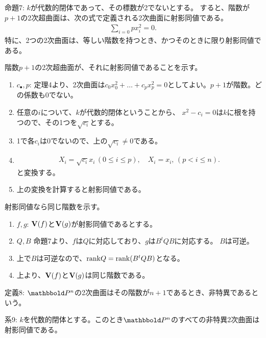 \begin{framed}
  命題7:
  $k$が代数的閉体であって、その標数が2でないとする。
  すると、階数が$p+1$の2次超曲面は、次の式で定義される2次曲面に射影同値である。
  \begin{align}
    \sum_{i=0}p x_i^2 = 0.
  \end{align}
  特に、2つの2次曲面は、等しい階数を持つとき、かつそのときに限り射影同値である。
\end{framed}
\begin{myproof}
  階数$p+1$の2次超曲面が、それに射影同値であることを示す。
  \begin{enumerate}
    \item $c_\bullet,p$: 定理4より、2次曲面は$c_0 x_0^2 + \dots + c_p x_p^2=0$としてよい。$p+1$が階数。どの係数も0でない。
    \item 任意の$i$について、$k$が代数的閉体ということから、
    $x^2 - c_i = 0$は$k$に根を持つので、その1つを$\sqrt{c_i}$とする。
    \item
    1で各$c_i$は0でないので、上の$\sqrt{c_i} \neq 0$である。
    \item
    \begin{align}
      X_i = \sqrt{c_i}x_i \, (0\le i \le p),\quad
      X_i = x_i,\, (p < i\le n).
    \end{align}
    と変換する。
    \item
    上の変換を計算すると射影同値である。
  \end{enumerate}

  射影同値なら同じ階数を示す。
  \begin{enumerate}
    \item $f,g$: $\textbf V(f)$と$\textbf V(g)$が射影同値であるとする。
    \item $Q, B$
    命題7より、$f$は$Q$に対応しており、$g$は$B^t Q B$に対応する。
    $B$は可逆。
    \item
    上で$B$は可逆なので、$\mathrm{rank} Q = \mathrm{rank} (B^t Q B)$となる。
    \item
    上より、$\textbf V(f)$と$\textbf V(g)$は同じ階数である。
  \end{enumerate}
\end{myproof}

\begin{framed}
  定義8:
  $\P^n$の2次曲面はその階数が$n+1$であるとき、非特異であるという。
\end{framed}

\begin{framed}
  系9:
  $k$を代数的閉体とする。このとき$\P^n$のすべての非特異2次曲面は射影同値である。
\end{framed}

